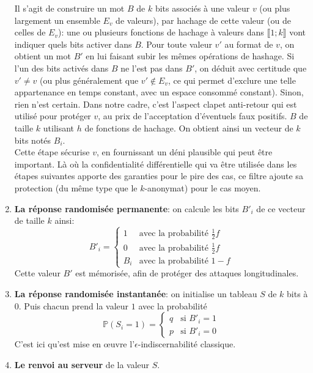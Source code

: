 \documentclass[a4paper,11pt]{article} %
\begin{document}
\begin{enumerate}
{    Il s'agit de construire un mot $B$ de $k$ bits associés à une valeur $v$ (ou plus largement un ensemble $E_v$ de valeurs), par hachage de cette valeur (ou de celles de $E_v$): une ou plusieurs fonctions de hachage à valeurs dans $\llbracket1;k\rrbracket$ vont indiquer quels bits activer dans $B$.
    Pour toute valeur $v'$ au format de $v$, on obtient un mot $B'$ en lui faisant subir les mêmes opérations de hashage.
    Si l'un des bits activés dans $B$ ne l'est pas dans $B'$, on déduit avec certitude que $v'\ne v$ (ou plus généralement que $v'\notin E_v$, ce qui permet d'exclure une telle appartenance en temps constant, avec un espace consommé constant). Sinon, rien n'est certain. Dans notre cadre, c'est l'aspect \og clapet anti-retour\fg{} qui est utilisé pour protéger $v$, au prix de l'acceptation d'éventuels \og{}faux positifs\fg{}.%
    }
    $B$ de taille $k$ utilisant $h$ de fonctions de hachage. On obtient ainsi un vecteur de $k$ bits notés $B_i$.\\
    Cette étape sécurise $v$, en fournissant un déni plausible qui peut être important. Là où la confidentialité différentielle qui va être utilisée dans les étapes suivantes apporte des garanties pour le pire des cas, ce filtre ajoute sa protection (du même type que le $k$-anonymat) pour le cas moyen.
    \item 
    \textbf{La réponse randomisée permanente}: on calcule les bits $B'_i$ de ce vecteur de taille $k$ ainsi:
    \[B'_i=\left\{\begin{array}{ll}
    1 & \text{avec la probabilité } \frac{1}{2}f \\[0.1em]
    0 & \text{avec la probabilité } \frac{1}{2}f \\[0.1em]
    B_i & \text{avec la probabilité } 1-f
    \end{array} \right.\]
    Cette valeur $B'$ est mémorisée, afin de protéger des attaques longitudinales.
    \item 
    \textbf{La réponse randomisée instantanée}: on initialise un tableau $S$ de $k$ bits à $0$. Puis chacun prend la valeur $1$ avec la probabilité
    \[\mathbb{P}(S_i=1) = \left\{ \begin{array}{ll}
    q & \text{si } B'_i=1 \\
    p & \text{si } B'_i=0 
    \end{array}    
     \right.\]
     C'est ici qu'est mise en œuvre l'$\epsilon$-indiscernabilité \og classique\fg{}.
    \item 
    \textbf{Le renvoi au serveur} de la valeur $S$.
\end{enumerate}
\end{document}

